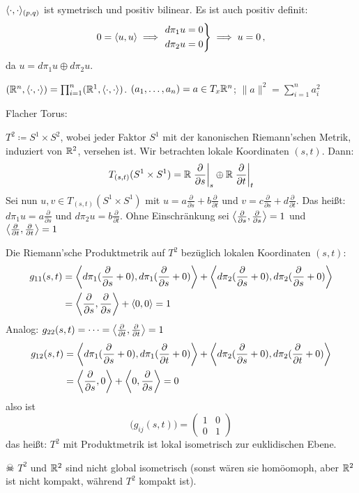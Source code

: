 \documentclass[a4paper,twoside,DIV15,BCOR12mm]{scrbook}
\renewcommand{\da}{\coloneqq}
\begin{document}
$\langle\cdot,\cdot\rangle_{(p,q)}$ ist symetrisch und positiv bilinear. Es ist auch positiv definit:
\[
0 = \langle u,u\rangle \implies 
\left.\begin{aligned}
d\pi_1 u = 0 \\
d\pi_2 u = 0
\end{aligned}\right\} \implies u=0\,,
\]
da $u=d\pi_1u \oplus d\pi_2 u$.

\begin{beispiele}
\item $(\mathbb{R}^n,\langle\cdot,\cdot\rangle) = \prod_{i=1}^n (\mathbb{R}^1,\langle\cdot,\cdot\rangle)$. $(a_1,\ldots,a_n) = a \in T_x\mathbb{R}^n$; $\|a\|^2 = \sum_{i=1}^n a_i^2$
\item Flacher Torus:

$T^2 \da S^1 \times S^2$, wobei jeder Faktor $S^1$ mit der kanonischen Riemann’schen Metrik, induziert von $\mathbb{R}^2$, versehen ist. Wir betrachten lokale Koordinaten $(s,t)$. Dann:
\[
T_{(s,t)}(S^1\times S^1) = \mathbb{R} \left.\frac{\partial}{\partial s}\right|_s \oplus \mathbb{R} \left.\frac{\partial}{\partial t}\right|_t
\]
Sei nun $u,v\in T_{(s,t)}(S^1\times S^1)$ mit $u=a \frac\partial{\partial s} + b \frac\partial{\partial t}$ und $v=c \frac\partial{\partial s} + d \frac\partial{\partial t}$. Das heißt: $d\pi_1 u = a \frac\partial{\partial s}$ und $d\pi_2 u = b \frac\partial{\partial t}$.  
Ohne Einschränkung sei $\left\langle\frac\partial{\partial s},\frac\partial{\partial s}\right\rangle = 1$ und $\left\langle\frac\partial{\partial t},\frac\partial{\partial t}\right\rangle = 1$

Die Riemann’sche Produktmetrik auf $T^2$ bezüglich lokalen Koordinaten $(s,t)$:
\begin{align*}
g_{11}(s,t) &= \left\langle d\pi_1 ({\frac\partial{\partial s}} + 0),d\pi_1 ({\frac\partial{\partial s}} + 0)\right\rangle + \left\langle d\pi_2 ({\frac\partial{\partial s}} + 0),d\pi_2 ({\frac\partial{\partial s}} + 0)\right\rangle \\
&= \left\langle\frac\partial{\partial s},\frac\partial{\partial s}\right\rangle + \left\langle0,0\right\rangle = 1
\end{align*}
Analog: $g_{22}(s,t) = \cdots = \left\langle\frac\partial{\partial t},\frac\partial{\partial t}\right\rangle = 1$
\begin{align*}
g_{12}(s,t) &= \left\langle d\pi_1 ({\frac\partial{\partial s}} + 0),d\pi_1 ({\frac\partial{\partial t}} + 0)\right\rangle + \left\langle d\pi_2 ({\frac\partial{\partial s}} + 0),d\pi_2 ({\frac\partial{\partial t}} + 0)\right\rangle \\
&= \left\langle\frac\partial{\partial s},0\right\rangle + \left\langle0,\frac\partial{\partial s}\right\rangle = 0
\end{align*}
also ist
\[
\Big( g_{ij}(s,t) \Big) = 
\begin{pmatrix}
1 & 0 \\ 0 & 1
\end{pmatrix}
\]
das heißt: $T^2$ mit Produktmetrik ist lokal isometrisch zur euklidischen Ebene. 

$\skull$ $T^2$ und $\mathbb{R}^2$ sind nicht global isometrisch (sonst wären sie homöomoph, aber $\mathbb{R}^2$ ist nicht kompakt, während $T^2$ kompakt ist).


\end{beispiele}
\end{document}
